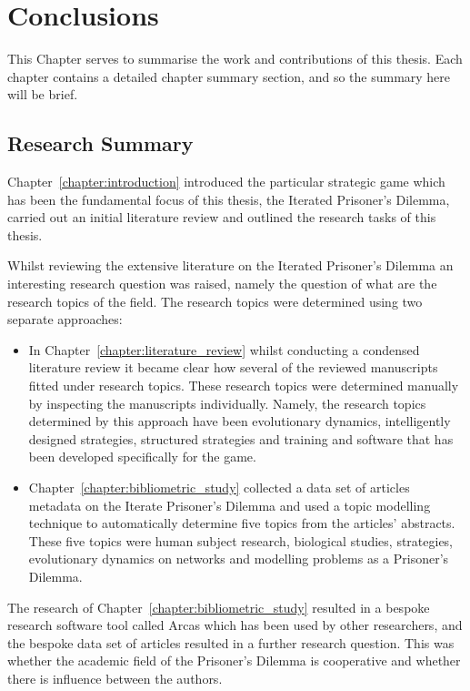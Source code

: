 \chapter{Conclusions}\label{chapter:conclusion}

This Chapter serves to summarise the work and contributions of this thesis. Each
chapter contains a detailed chapter summary section, and so the summary here will be
brief.

\section{Research Summary}

Chapter~\ref{chapter:introduction} introduced the particular strategic game
which has been the fundamental focus of this thesis, the Iterated Prisoner's
Dilemma, carried out an initial literature review and outlined the research
tasks of this thesis.

Whilst reviewing the extensive literature on the Iterated Prisoner's Dilemma an
interesting research question was raised, namely the question of what are the
research topics of the field. The research topics were determined using two
separate approaches:

\begin{itemize}
    \item In Chapter~\ref{chapter:literature_review} whilst conducting a
    condensed literature review it became clear how several of the reviewed
    manuscripts fitted under research topics. These research topics were
    determined manually by inspecting the manuscripts individually. Namely, the
    research topics determined by this approach have been evolutionary dynamics,
    intelligently designed strategies, structured strategies and training and
    software that has been developed specifically for the game.
    \item Chapter~\ref{chapter:bibliometric_study} collected a data set of articles
    metadata on the Iterate Prisoner's Dilemma and used a topic modelling technique
    to automatically determine five topics from the articles' abstracts.
    These five topics were human
    subject research, biological studies, strategies, evolutionary dynamics on
    networks and modelling problems as a Prisoner's Dilemma.
\end{itemize}

The research of Chapter~\ref{chapter:bibliometric_study} resulted in a bespoke
research software tool called Arcas which has been used by other researchers,
and the bespoke data set of articles resulted in a further research question.
This was whether the academic field of the Prisoner’s Dilemma is cooperative and
whether there is influence between the authors.


